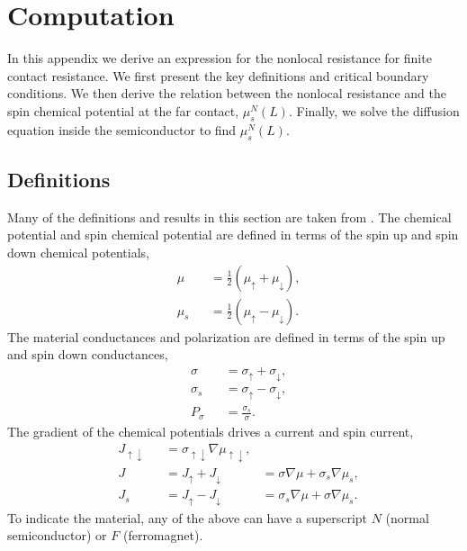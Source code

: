 \appendix*
\section{Computation}

In this appendix we derive an expression for
the nonlocal resistance for finite contact resistance.
We first present the key definitions and critical boundary conditions.
We then derive the relation between the nonlocal resistance
and the spin chemical potential at the far contact, $μ_s^N(L)$.
Finally, we solve the diffusion equation inside the semiconductor to find $μ_s^N(L)$.

\subsection{Definitions}

Many of the definitions and results in this section are taken from
\cite{ActaPhysicaSlovaca.57.4_5.565-907}.
The chemical potential and spin chemical potential are defined in terms
of the spin up and spin down chemical potentials,
\begin{subequations}
  \label{eq:potentials}
  \begin{alignat}{2}
    & μ   && = \frac{1}{2} \left( μ_↑ + μ_↓ \right) , \\
    & μ_s && = \frac{1}{2} \left( μ_↑ - μ_↓ \right) .
  \end{alignat}
\end{subequations}
The material conductances and polarization are defined in terms
of the spin up and spin down conductances,
\begin{subequations}
  \label{eq:conductances}
  \begin{alignat}{2}
    & σ   && = σ_↑ + σ_↓ , \\
    & σ_s && = σ_↑ - σ_↓ , \\
    & P_σ && = \frac{σ_s}{σ} .
  \end{alignat}
\end{subequations}
The gradient of the chemical potentials drives a current and spin current,
\begin{subequations}
  \label{eq:currents}
  \begin{alignat}{3}
    & J_{↑↓} && = σ_{↑↓} ∇μ_{↑↓} , \\
    \label{eq:currents.current}
    & J      && = J_↑ + J_↓      & = σ   ∇μ + σ_s ∇μ_s , \\
    \label{eq:currents.spincurrent}
    & J_s    && = J_↑ - J_↓      & = σ_s ∇μ + σ   ∇μ_s .
  \end{alignat}
\end{subequations}
To indicate the material, any of the above can have a superscript
$N$ (normal semiconductor) or $F$ (ferromagnet).

